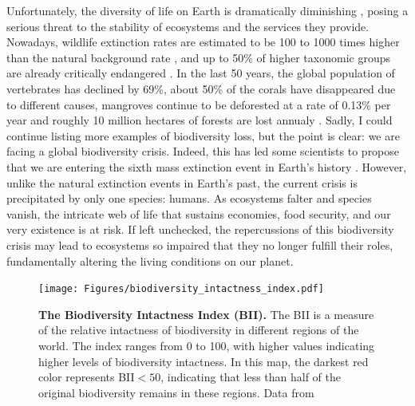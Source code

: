Unfortunately, the diversity of life on Earth is dramatically diminishing
\cite{Hughes1997,Ceballos2002,Pereira2010}, posing a serious threat to the
stability of ecosystems and the services they provide. Nowadays, wildlife
extinction rates are estimated to be 100 to 1000 times higher than the natural
background rate \cite{Ceballos2015,Pimm2014}, and up to 50\% of higher
taxonomic groups are already critically endangered \cite{Smith2009}. In the
last 50 years, the global population of vertebrates has declined by 69\%, about
50\% of the corals have disappeared due to different causes, mangroves
continue to be deforested at a rate of 0.13\% per year and roughly 10 million
hectares of forests are lost annualy \cite{WWF2022}. Sadly, I could continue
listing more examples of biodiversity loss, but the point is clear: we are
facing a global biodiversity crisis. Indeed, this has led some scientists to
propose that we are entering the sixth mass extinction event in Earth's history
\cite{Barnosky2011}. However, unlike the natural extinction events in Earth’s
past, the current crisis is precipitated by only one species: humans. As
ecosystems falter and species vanish, the intricate web of life that sustains
economies, food security, and our very existence is at risk. If left unchecked,
the repercussions of this biodiversity crisis may lead to ecosystems so
impaired that they no longer fulfill their roles, fundamentally altering the
living conditions on our planet.

\begin{figure}[H]
  \centering
  \texttt{[image: Figures/biodiversity\_intactness\_index.pdf]}
  \caption[The Biodiversity Intactness
    Index]{\label{fig:biodiversity_intactness_index} \textbf{The Biodiversity
      Intactness Index (BII).} The BII is a measure of the relative intactness
    of biodiversity in	different regions of the world. The index ranges from 0
    to 100, with higher values indicating higher levels of biodiversity
    intactness. In this map, the darkest red color represents BII$<50$,
    indicating that less than half of the original biodiversity remains in
    these regions. Data from \cite{Newbold2016}}
\end{figure}

